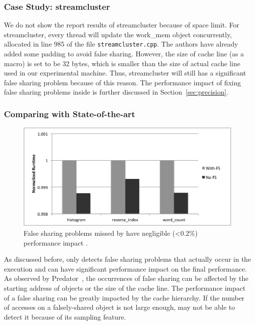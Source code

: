 \subsubsection{Case Study: streamcluster}

We do not show the report results of streamcluster because of space limit. For streamcluster, every thread will update the work\_mem object concurrently, allocated in line 985 of the file \texttt{streamcluster.cpp}. The authors have already added some padding to avoid false sharing. However, the size of cache line (as a macro) is set to be 32 bytes, which is smaller than the size of actual cache line used in our experimental machine. Thus, streamcluster will still has a significant false sharing problem because of this reason. The performance impact of fixing false sharing problems inside is further discussed in Section~\ref{sec:precision}. 


\subsubsection{Comparing with State-of-the-art}

\begin{figure}[htbp]
\centering
\label{fig:fseffectiveness}
\includegraphics[width=.9\columnwidth]{figure/trivial.pdf}
\caption{False sharing problems missed by \cheetah{} have negligible (<0.2\%) performance impact .}
\end{figure}

As discussed before, \cheetah{} only detects false sharing problems that actually occur in the execution and can have significant performance impact on the final performance. As observed by Predator~\cite{Predator}, the occurrences of false sharing can be affected by the starting address of objects or the size of the cache line. The performance impact of a false sharing can be greatly impacted by the cache hierarchy. If the number of accesses on a falsely-shared object is not large enough, \cheetah{} may not be able to detect it because of its sampling feature. 


